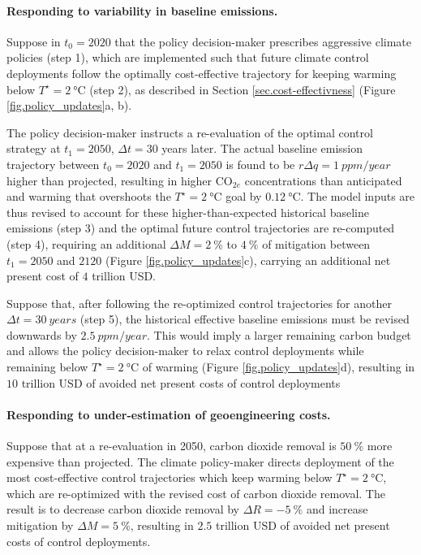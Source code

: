 \documentclass{article}
\begin{document}
\paragraph{Responding to variability in baseline emissions.}
Suppose in $t_{0} = 2020$ that the policy decision-maker prescribes aggressive climate policies (step 1), which are implemented such that future climate control deployments follow the optimally cost-effective trajectory for keeping warming below $T^{\star} = \SI{2}{\celsius}$ (step 2), as described in Section \ref{sec.cost-effectivness} (Figure \ref{fig.policy_updates}a, b). 

The policy decision-maker instructs a re-evaluation of the optimal control strategy at $t_{1} = 2050$, $\Delta t = 30$ years later. The actual baseline emission trajectory between $t_{0}=2020$ and $t_{1}=2050$ is found to be $r\Delta q = \SI{1}{ppm/year}$ higher than projected, resulting in higher CO$_{2e}$ concentrations than anticipated and warming that overshoots the $T^{\star} = \SI{2}{\celsius}$ goal by $\SI{0.12}{\celsius}$. The model inputs are thus revised to account for these higher-than-expected historical baseline emissions (step 3) and the optimal future control trajectories are re-computed (step 4), requiring an additional $\Delta M = \SI{2}{\%}$ to $\SI{4}{\%}$ of mitigation between $t_{1} = 2050$ and $2120$ (Figure \ref{fig.policy_updates}c), carrying an additional net present cost of $4$ trillion USD.

Suppose that, after following the re-optimized control trajectories for another $\Delta t = \SI{30}{years}$ (step 5), the historical effective baseline emissions must be revised downwards by $\SI{2.5}{ppm/year}$. This would imply a larger remaining carbon budget \citep{millar_cumulative_2016} and allows the policy decision-maker to relax control deployments while remaining below $T^{\star} = \SI{2}{\celsius}$ of warming (Figure \ref{fig.policy_updates}d), resulting in $10$ trillion USD of avoided net present costs of control deployments

\paragraph{Responding to under-estimation of geoengineering costs.}

Suppose that at a re-evaluation in 2050, carbon dioxide removal is $\SI{50}{\%}$ more expensive than projected. The climate policy-maker directs deployment of the most cost-effective control trajectories which keep warming below $T^{\star}=\SI{2}{\celsius}$, which are re-optimized with the revised cost of carbon dioxide removal. The result is to decrease carbon dioxide removal by $\Delta R = \SI{-5}{\%}$ and increase mitigation by $\Delta M = \SI{5}{\%}$, resulting in $2.5$ trillion USD of avoided net present costs of control deployments.
\end{document}
